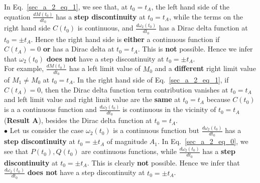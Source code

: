 \documentclass[11pt]{elsarticle}
\begin{document}
In Eq.~\ref{sec_a_2_eq_1}, we see that, at $t_0 = t_A$, the left hand side of the equation $\frac{dM(t_0)}{dt_0}$ has a \textbf{step discontinuity} at $t_0=t_A$, while  the terms on the right hand side $C(t_0)$ is continuous, and $\frac{d\omega_2(t_0)}{dt_0}$ has a Dirac delta function at $t_0=\pm t_A$. Hence the right hand side is \textbf{either} a continuous function if $C(t_A)=0$\textbf{ or} has a Dirac delta at $t_0 = t_A$. This is \textbf{not} possible. Hence we infer that $\omega_2(t_0)$ \textbf{does not} have a step discontinuity at $t_0=\pm t_A$. \\

For example, $\frac{dM(t_0)}{dt_0}$ has a left limit value of $M_0$ and a \textbf{different} right limit value of $M_1 \neq M_0$ at $t_0 = t_A$. In the right hand side of Eq.~\ref{sec_a_2_eq_1}, if $C(t_A)=0$, then the Dirac delta function term contribution vanishes at $t_0 = t_A$ and left limit value and right limit value are the \textbf{same} at $t_0 = t_A$ because $C(t_0)$ is a a continuous function and $\frac{d\omega_2(t_0)}{dt_0}$ is continuous in the vicinity of $t_0 = t_A$ (\textbf{Result A}), besides the Dirac delta function at $t_0 = t_A$.\\

$\bullet$ Let us consider the case $\omega_2(t_0)$ is a continuous function but $\frac{d\omega_2(t_0)}{dt_0}$ has a \textbf{step discontinuity} at $t_0= \pm t_A$ of magnitude $A_1$. In Eq.~\ref{sec_a_2_eq_0}, we see that $P(t_0), Q(t_0)$ are continuous functions, while $\frac{d\omega_2(t_0)}{dt_0}$ has a \textbf{step discontinuity} at $t_0= \pm t_A$. This is clearly \textbf{not} possible. Hence we infer that $\frac{d\omega_2(t_0)}{dt_0}$ \textbf{does not} have a step discontinuity at $t_0=\pm t_A$. \\


\end{document}
